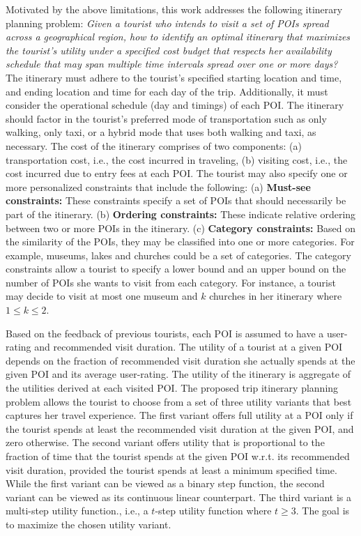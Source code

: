 Motivated by the above limitations, this work addresses the following itinerary planning problem: \emph{Given a tourist who intends to visit a set of POIs spread across a geographical region, how to  identify an optimal itinerary that maximizes the tourist's utility under a specified cost budget that respects her availability schedule that may span multiple time intervals spread over one or more days?} The itinerary must adhere to the tourist's specified starting location and time, and ending location and time for each day of the trip. Additionally, it must consider the operational schedule (day and timings) of each POI.  The itinerary should factor in the tourist's preferred mode of transportation such as only walking, only taxi, or a hybrid mode that uses both walking and taxi, as necessary. The cost of the itinerary comprises of two components: (a) transportation cost, i.e., the cost incurred in traveling, (b) visiting cost, i.e., the cost incurred due to entry fees at each POI. The tourist may also specify one or more personalized constraints that include the following: (a) \textbf{Must-see constraints:} These constraints specify a set of POIs that should necessarily be part of the itinerary. (b) \textbf{Ordering constraints:} These indicate relative ordering between two or more POIs in the itinerary. (c) \textbf{Category constraints:} Based on the similarity of the POIs, they may be classified into one or more categories. For example, museums, lakes and churches could be a set of categories.  The category constraints allow a tourist to specify a lower bound and an upper bound on the number of POIs she wants to visit from each category. For instance, a tourist may decide to visit at most one museum and $k$ churches in her itinerary where $1 \le k \le 2$. 

Based on the feedback of previous tourists, each POI is assumed to have a user-rating and recommended visit duration. The utility of a tourist at a given POI depends on the fraction of recommended visit duration she actually spends at the given POI and its average user-rating. The utility of the itinerary is aggregate of the utilities derived at each visited POI. The proposed trip itinerary planning problem allows the tourist to choose from a set of three utility variants that best captures her travel experience. The first variant offers full utility at a POI only if the tourist spends at least the recommended visit duration at the given POI, and zero otherwise. The second variant offers utility that is proportional to the fraction of time that the tourist spends at the given POI w.r.t. its recommended visit duration, provided the tourist  spends at least a minimum specified time. While the first variant can be viewed as a binary step function, the second variant can be viewed as its continuous linear counterpart. The third variant is a multi-step utility function., i.e., a $t$-step utility function where $t \ge 3$. The goal is to maximize the chosen utility variant.

